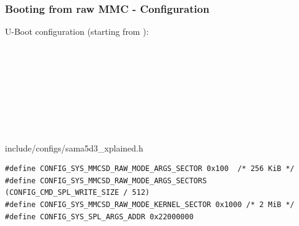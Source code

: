 \begin{frame}[fragile]
\frametitle{Booting from raw MMC - Configuration}
	\small
	U-Boot configuration (starting from
        ):\\
	\\
	\\
	\\
	\\
	\\
	\\
	\\
	\\
        \begin{block}{include/configs/sama5d3\_xplained.h}
        \begin{verbatim}
#define CONFIG_SYS_MMCSD_RAW_MODE_ARGS_SECTOR 0x100  /* 256 KiB */
#define CONFIG_SYS_MMCSD_RAW_MODE_ARGS_SECTORS (CONFIG_CMD_SPL_WRITE_SIZE / 512)
#define CONFIG_SYS_MMCSD_RAW_MODE_KERNEL_SECTOR 0x1000 /* 2 MiB */
#define CONFIG_SYS_SPL_ARGS_ADDR 0x22000000
	\end{verbatim}
	\end{block}
\end{frame}

